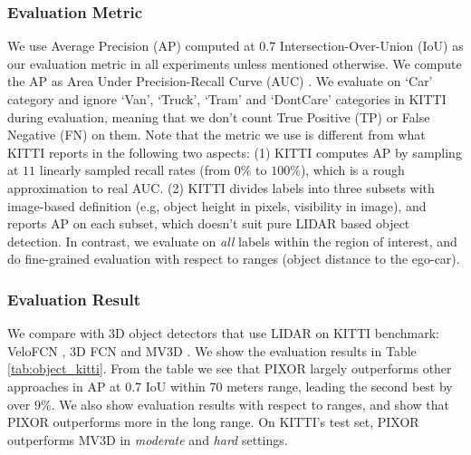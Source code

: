 \vspace{-0.2cm}
\subsubsection{Evaluation Metric}
We use Average Precision (AP) computed at $0.7$ Intersection-Over-Union (IoU) as our evaluation metric in all experiments unless mentioned otherwise. We compute the AP as Area Under Precision-Recall Curve (AUC) \cite{pascal}. We evaluate on `Car' category and ignore `Van', `Truck', `Tram' and `DontCare' categories in KITTI during evaluation, meaning that we don't count True Positive (TP) or False Negative (FN) on them. Note that the metric we use is different from what KITTI reports in the following two aspects: (1) KITTI computes AP by sampling at $11$ linearly sampled recall rates (from $0\%$ to $100\%$), which is a rough approximation to real AUC. (2) KITTI divides labels into three subsets with image-based definition (e.g, object height in pixels, visibility in image), and reports AP on each subset, which doesn't suit pure LIDAR based object detection. In contrast, we evaluate on {\it all} labels within the region of interest, and do fine-grained evaluation with respect to ranges (object distance to the ego-car).

\vspace{-0.2cm}
\subsubsection{Evaluation Result}
We compare with 3D object detectors that use LIDAR on KITTI benchmark: VeloFCN \cite{velofcn}, 3D FCN \cite{3dfcn} and MV3D \cite{mv3d}. We show the evaluation results in Table \ref{tab:object_kitti}. From the table we see that PIXOR largely outperforms other approaches in AP at 0.7 IoU within 70 meters range, leading the second best by over $9\%$. We also show evaluation results with respect to ranges, and show that PIXOR outperforms more in the long range. On KITTI's test set, PIXOR outperforms MV3D in {\it moderate} and {\it hard} settings.

